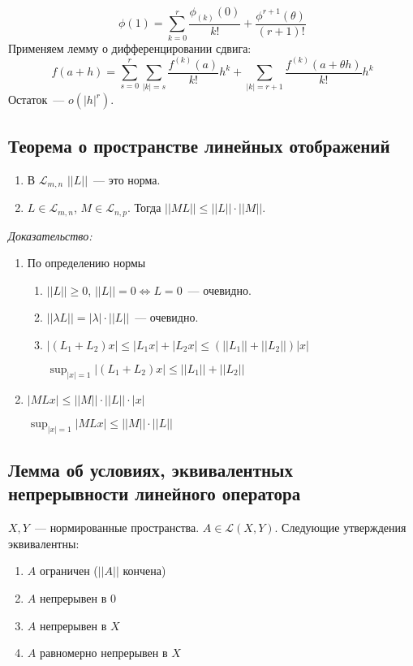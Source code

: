 \documentclass[paper=a4, fontsize=11pt]{article}
\begin{document}
$$\phi(1) = \sum_{k=0}^r \frac{\phi_{(k)}(0)}{k!} + \frac{\phi^{r+1}(\theta)}{(r+1)!}$$
Применяем лемму о дифференцировании сдвига:
$$f(a+h) = \sum_{s=0}^r \sum_{|k|=s} \frac{f^{(k)}(a)}{k!} h^k + \sum_{|k|=r+1} \frac{f^{(k)}(a+\theta h)}{k!} h^k$$
Остаток~--- $o(|h|^r)$.

\subsection{Теорема о пространстве линейных отображений}
\begin{enumerate}
    \item В $\mathscr{L}_{m,n}$ $||L||$~--- это норма.
    \item $L \in \mathscr{L}_{m,n}$, $M \in \mathscr{L}_{n,p}$. Тогда $||ML|| \leq ||L|| \cdot ||M||$.
\end{enumerate}

\emph{Доказательство:}
\begin{enumerate}
    \item По определению нормы
    \begin{enumerate}
        \item $||L|| \geq 0$, $||L|| = 0 \Leftrightarrow L = 0$~--- очевидно.
        \item $||\lambda L|| = |\lambda| \cdot ||L||$~--- очевидно.
        \item $|(L_1+L_2)x| \leq |L_1 x| + |L_2 x| \leq (||L_1||+||L_2||)|x|$

        $\sup_{|x|=1} |(L_1+L_2)x| \leq ||L_1||+||L_2||$
    \end{enumerate}
    \item $|ML x| \leq ||M|| \cdot ||L|| \cdot |x|$

    $\sup_{|x|=1} |ML x| \leq ||M|| \cdot ||L||$
\end{enumerate}

\subsection{Лемма об условиях, эквивалентных непрерывности линейного оператора}
$X,Y$~--- нормированные пространства.  $A \in \mathscr{L}(X,Y)$. Следующие утверждения эквивалентны:
\begin{enumerate}
    \item $A$ ограничен ($||A||$ кончена)
    \item $A$ непрерывен в $0$
    \item $A$ непрерывен в $X$
    \item $A$ равномерно непрерывен в $X$
\end{enumerate}
\end{document}
